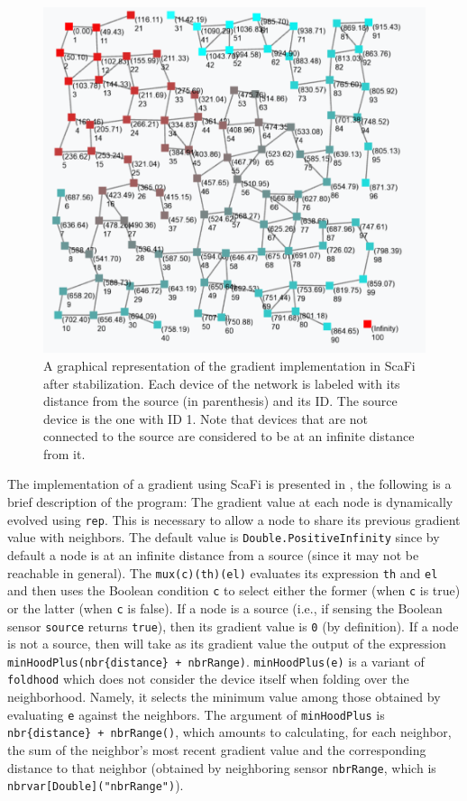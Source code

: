 \begin{figure}[ht!]
    \centering
    \includegraphics[width=.8\linewidth]{figures/scafi-gradient.png}
    \caption{A graphical representation of the gradient implementation in ScaFi after stabilization. Each device of the network is labeled with its distance from the source (in parenthesis) and its ID. The source device is the one with ID 1. Note that devices that are not connected to the source are considered to be at an infinite distance from it.}
    \label{fig:scafi-gradient}
\end{figure}

The implementation of a gradient using ScaFi is presented in , the following is a brief description of the program:
The gradient value at each node is dynamically evolved using \texttt{rep}. This is necessary to allow a node to share its previous gradient value with neighbors. The default value is \texttt{Double.PositiveInfinity} since by default a node is at an infinite distance from a source (since it may not be reachable in general). The \texttt{mux(c)(th)(el)} evaluates its expression \texttt{th} and \texttt{el} and then uses the Boolean condition \texttt{c} to select either the former (when \texttt{c} is true) or the latter (when \texttt{c} is false).
If a node is a source (i.e., if sensing the Boolean sensor \texttt{source} returns \texttt{true}), then its gradient value is \texttt{0} (by definition).
If a node is not a source, then will take as its gradient value the output of the expression \texttt{minHoodPlus(nbr\{distance\} + nbrRange)}.
\texttt{minHoodPlus(e)} is a variant of \texttt{foldhood} which does not consider the device itself when folding over the neighborhood. Namely, it selects the minimum value among those obtained by evaluating \texttt{e} against the neighbors. The argument of \texttt{minHoodPlus} is \texttt{nbr\{distance\} + nbrRange()}, which amounts to calculating, for each neighbor, the sum of the neighbor's most recent gradient value and the corresponding distance to that neighbor (obtained by neighboring sensor \texttt{nbrRange}, which is \texttt{nbrvar[Double]("nbrRange")}).

